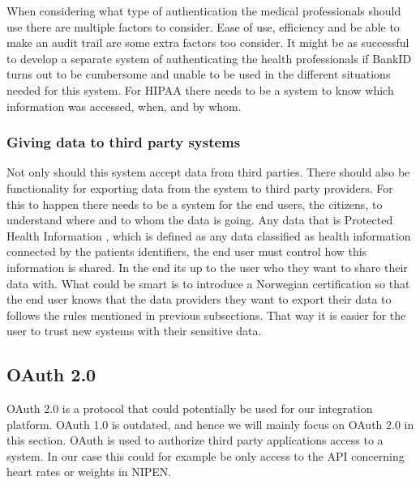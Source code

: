 When considering what type of authentication the medical professionals should use there are multiple factors to consider. 
Ease of use, efficiency and be able to make an audit trail are some extra factors too consider.
It might be as successful to develop a separate system of authenticating the health professionals if BankID turns out to be cumbersome and unable to be used in the different situations needed for this system. 
For HIPAA there needs to be a system to know which information was accessed, when, and by whom. \cite{Audit}

\subsubsection{Giving data to third party systems}
Not only should this system accept data from third parties. 
There should also be functionality for exporting data from the system to third party providers. 
For this to happen there needs to be a system for the end users, the citizens, to understand where and to whom the data is going.
Any data that is Protected Health Information \cite{PHI}, which is defined as any data classified as health information connected by the patients identifiers, the end user must control how this information is shared. 
In the end its up to the user who they want to share their data with.
What could be smart is to introduce a Norwegian certification so that the end user knows that the data providers they want to export their data to follows the rules mentioned in previous subsections. 
That way it is easier for the user to trust new systems with their sensitive data.

\subsection{OAuth 2.0}

OAuth 2.0 is a protocol that could potentially be used for our integration platform.
OAuth 1.0 is outdated, and hence we will mainly focus on OAuth 2.0 in this section.
OAuth is used to authorize third party applications access to a system.
In our case this could for example be only access to the API concerning heart rates or weights in NIPEN.


